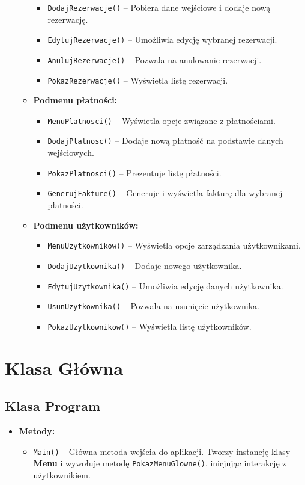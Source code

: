 \begin{itemize}
\begin{itemize}
\begin{itemize}
            \item \texttt{DodajRezerwacje()} -- Pobiera dane wejściowe i dodaje nową rezerwację.
            \item \texttt{EdytujRezerwacje()} -- Umożliwia edycję wybranej rezerwacji.
            \item \texttt{AnulujRezerwacje()} -- Pozwala na anulowanie rezerwacji.
            \item \texttt{PokazRezerwacje()} -- Wyświetla listę rezerwacji.
        \end{itemize}
        \item \textbf{Podmenu płatności:}
        \begin{itemize}
            \item \texttt{MenuPlatnosci()} -- Wyświetla opcje związane z płatnościami.
            \item \texttt{DodajPlatnosc()} -- Dodaje nową płatność na podstawie danych wejściowych.
            \item \texttt{PokazPlatnosci()} -- Prezentuje listę płatności.
            \item \texttt{GenerujFakture()} -- Generuje i wyświetla fakturę dla wybranej płatności.
        \end{itemize}
        \item \textbf{Podmenu użytkowników:}
        \begin{itemize}
            \item \texttt{MenuUzytkownikow()} -- Wyświetla opcje zarządzania użytkownikami.
            \item \texttt{DodajUzytkownika()} -- Dodaje nowego użytkownika.
            \item \texttt{EdytujUzytkownika()} -- Umożliwia edycję danych użytkownika.
            \item \texttt{UsunUzytkownika()} -- Pozwala na usunięcie użytkownika.
            \item \texttt{PokazUzytkownikow()} -- Wyświetla listę użytkowników.
        \end{itemize}
    \end{itemize}
\end{itemize}

\section{Klasa Główna}
\subsection*{Klasa \textbf{Program}}
\begin{itemize}
    \item \textbf{Metody:}
    \begin{itemize}
        \item \texttt{Main()} -- Główna metoda wejścia do aplikacji. Tworzy instancję klasy \textbf{Menu} i wywołuje metodę \texttt{PokazMenuGlowne()}, inicjując interakcję z użytkownikiem.
    \end{itemize}
\end{itemize}

